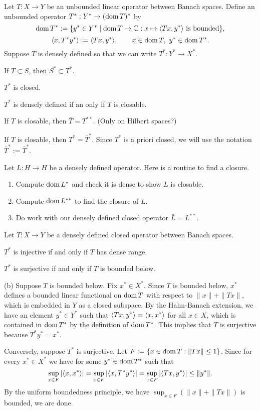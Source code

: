 \documentclass{../../large}
\begin{document}
\begin{prb}
Let $T:X\to Y$ be an unbounded linear operator between Banach spaces.
Define an unbounded operator $T^*:Y^*\to(\operatorname{dom} T)^*$ by
\[\operatorname{dom} T^*:=\{y^*\in Y^*\mid \operatorname{dom} T\to\mathbb{C}:x\mapsto\langle Tx,y^*\rangle\text{ is bounded}\},\]
\[\langle x,T^*y^*\rangle:=\langle Tx,y^*\rangle,\qquad x\in\operatorname{dom} T,\ y^*\in\operatorname{dom} T^*.\]
Suppose $T$ is densely defined so that we can write $T^*:Y^*\to X^*$.
\begin{parts}
\item If $T\subset S$, then $S^*\subset T^*$.
\item $T^*$ is closed.
\item $T^*$ is densely defined if an only if $T$ is closable.
\item If $T$ is closable, then $\bar T=T^{**}$. (Only on Hilbert spaces?)
\item If $T$ is closable, then $T^*=\bar T^*$.
Since $T^*$ is a priori closed, we will use the notation $\bar T^*:={\bar T}^*$.
\end{parts}
\end{prb}

Let $L:H\to H$ be a densely defined operator.
Here is a routine to find a closure.
\begin{enumerate}
\item Compute $\operatorname{dom} L^*$ and check it is dense to show $L$ is closable.
\item Compute $\operatorname{dom} L^{**}$ to find the closure of $L$.
\item Do work with our densely defined closed operator $\bar L=L^{**}$.
\end{enumerate}


\begin{prb}
Let $T:X\to Y$ be a densely defined closed operator between Banach spaces.
\begin{parts}
\item $T^*$ is injective if and only if $T$ has dense range.
\item $T^*$ is surjective if and only if $T$ is bounded below.
\end{parts}
\end{prb}
\begin{pf}
(b)
Suppose $T$ is bounded below.
Fix $x^*\in X^*$.
Since $T$ is bounded below, $x^*$ defines a bounded linear functional on $\operatorname{dom} T$ with respect to $\|x\|+\|Tx\|$, which is embedded in $Y$ as a closed subspace.
By the Hahn-Banach extension, we have an element $y^*\in Y^*$ such that $\langle Tx,y^*\rangle=\langle x,x^*\rangle$ for all $x\in X$, which is contained in $\operatorname{dom} T^*$ by the definition of $\operatorname{dom} T^*$.
This implies that $T$ is surjective because $T^*y^*=x^*$.

Conversely, suppose $T^*$ is surjective.
Let $F:=\{x\in\operatorname{dom} T:\|Tx\|\le1\}$.
Since for every $x^*\in X^*$ we have for some $y^*\in\operatorname{dom} T^*$ such that
\[\sup_{x\in F}|\langle x,x^*\rangle|=\sup_{x\in F}|\langle x,T^*y^*\rangle|=\sup_{x\in F}|\langle Tx,y^*\rangle|\le\|y^*\|.\]
By the uniform boundedness principle, we have $\sup_{x\in F}(\|x\|+\|Tx\|)$ is bounded, we are done.
\end{pf}
\end{document}
